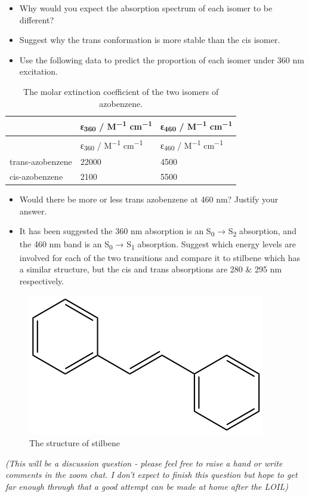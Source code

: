 \documentclass[
]{book}
\begin{document}
\begin{itemize}
\item
  Why would you expect the absorption spectrum of each isomer to be different?
\item
  Suggest why the trans conformation is more stable than the cis isomer.
\item
  Use the following data to predict the proportion of each isomer under 360 nm excitation.
\end{itemize}

\begin{longtable}[]{@{}lll@{}}
\caption{\label{tab:azobenzeneabs} The molar extinction coefficient of the two isomers of azobenzene.}\tabularnewline
\toprule
& ε\textsubscript{360} / M\textsuperscript{−1} cm\textsuperscript{−1} & ε\textsubscript{460} / M\textsuperscript{−1} cm\textsuperscript{−1}\tabularnewline
\midrule
\endfirsthead
\toprule
& ε\textsubscript{360} / M\textsuperscript{−1} cm\textsuperscript{−1} & ε\textsubscript{460} / M\textsuperscript{−1} cm\textsuperscript{−1}\tabularnewline
\midrule
\endhead
trans-azobenzene & 22000 & 4500\tabularnewline
cis-azobenzene & 2100 & 5500\tabularnewline
\bottomrule
\end{longtable}

\begin{itemize}
\item
  Would there be more or less trans azobenzene at 460 nm? Justify your answer.
\item
  It has been suggested the 360 nm absorption is an S\textsubscript{0} → S\textsubscript{2} absorption, and the 460 nm band is an S\textsubscript{0} → S\textsubscript{1} absorption. Suggest which energy levels are involved for each of the two transitions and compare it to stilbene which has a similar structure, but the cis and trans absorptions are 280 \& 295 nm respectively.
\end{itemize}

\begin{figure}

{\centering \includegraphics[width=0.3\linewidth]{images/stilbene} 

}

\caption{The  structure of stilbene}\label{fig:stilbene}
\end{figure}

\emph{(This will be a discussion question - please feel free to raise a hand or write comments in the zoom chat. I don't expect to finish this question but hope to get far enough through that a good attempt can be made at home after the LOIL)}

  
\end{document}
